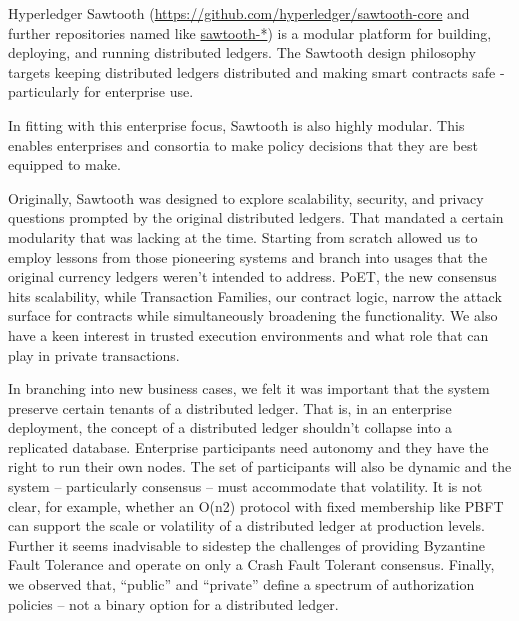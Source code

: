 Hyperledger Sawtooth (\url{https://github.com/hyperledger/sawtooth-core} and further repositories named like \url{sawtooth-*}) is a modular platform for building, deploying, and running distributed ledgers. The Sawtooth design philosophy targets keeping distributed ledgers distributed and making smart contracts safe - particularly for enterprise use.

In fitting with this enterprise focus, Sawtooth is also highly modular. This enables enterprises and consortia to make policy decisions that they are best equipped to make.

Originally, Sawtooth was designed to explore scalability, security, and privacy questions prompted by the original distributed ledgers. That mandated a certain modularity that was lacking at the time. Starting from scratch allowed us to employ lessons from those pioneering systems and branch into usages that the original currency ledgers weren’t intended to address. PoET, the new consensus hits scalability, while Transaction Families, our contract logic, narrow the attack surface for contracts while simultaneously broadening the functionality. We also have a keen interest in trusted execution environments and what role that can play in private transactions.

In branching into new business cases, we felt it was important that the system preserve certain tenants of a distributed ledger. That is, in an enterprise deployment, the concept of a distributed ledger shouldn’t collapse into a replicated database. Enterprise participants need autonomy and they have the right to run their own nodes. The set of participants will also be dynamic and the system – particularly consensus – must accommodate that volatility. It is not clear, for example, whether an O(n2) protocol with fixed membership like PBFT can support the scale or volatility of a distributed ledger at production levels. Further it seems inadvisable to sidestep the challenges of providing Byzantine Fault Tolerance and operate on only a Crash Fault Tolerant consensus. Finally, we observed that, “public” and “private” define a spectrum of authorization policies – not a binary option for a distributed ledger.
